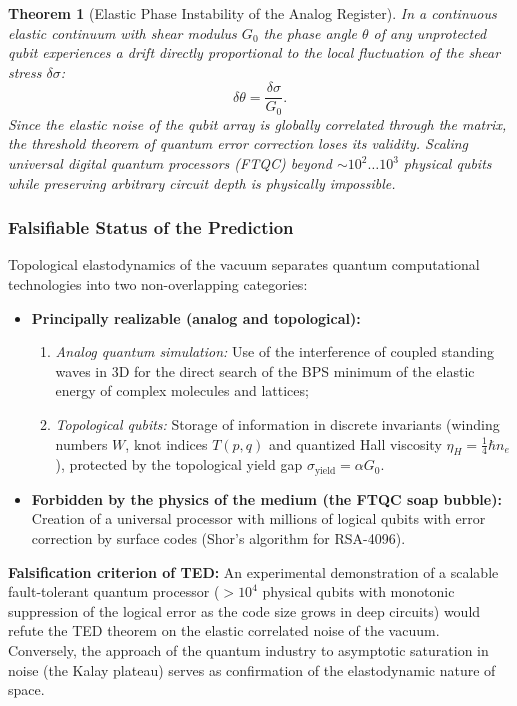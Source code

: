 \documentclass[11pt,a4paper]{article}
\newtheorem{theorem}{Theorem}
\theoremstyle{definition}
\theoremstyle{remark}
\begin{document}
\begin{theorem}[Elastic Phase Instability of the Analog Register]
\label{thm:analog_phase_instability}
In a continuous elastic continuum with shear modulus $G_0$ the phase angle $\theta$ of any unprotected qubit experiences a drift directly proportional to the local fluctuation of the shear stress $\delta\sigma$:
\begin{equation}
\delta\theta = \frac{\delta\sigma}{G_0}.
\label{eq:phase_drift_formula}
\end{equation}
Since the elastic noise of the qubit array is globally correlated through the matrix, the threshold theorem of quantum error correction loses its validity. Scaling universal digital quantum processors (FTQC) beyond $\sim 10^2 \dots 10^3$ physical qubits while preserving arbitrary circuit depth is physically impossible.
\end{theorem}

\subsubsection{Falsifiable Status of the Prediction}

Topological elastodynamics of the vacuum separates quantum computational technologies into two non-overlapping categories:
\begin{itemize}
\item \textbf{Principally realizable (analog and topological):}
\begin{enumerate}
\item \textit{Analog quantum simulation:} Use of the interference of coupled standing waves in 3D for the direct search of the BPS minimum of the elastic energy of complex molecules and lattices;
\item \textit{Topological qubits:} Storage of information in discrete invariants (winding numbers $W$, knot indices $T(p,q)$ and quantized Hall viscosity $\eta_H = \frac{1}{4}\hbar n_e$), protected by the topological yield gap $\sigma_{\mathrm{yield}} = \alpha G_0$.
\end{enumerate}
\item \textbf{Forbidden by the physics of the medium (the FTQC soap bubble):}
Creation of a universal processor with millions of logical qubits with error correction by surface codes (Shor's algorithm for RSA-4096).
\end{itemize}

\textbf{Falsification criterion of TED:} An experimental demonstration of a scalable fault-tolerant quantum processor ($> 10^4$ physical qubits with monotonic suppression of the logical error as the code size grows in deep circuits) would refute the TED theorem on the elastic correlated noise of the vacuum. Conversely, the approach of the quantum industry to asymptotic saturation in noise (the Kalay plateau) serves as confirmation of the elastodynamic nature of space.
\end{document}

